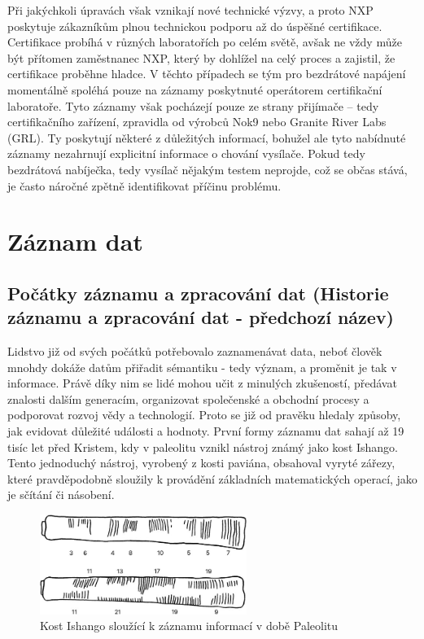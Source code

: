 Při jakýchkoli úpravách však vznikají nové technické výzvy, a proto NXP poskytuje zákazníkům plnou technickou podporu až do úspěšné certifikace. Certifikace 
probíhá v různých laboratořích po celém světě, avšak ne vždy může být přítomen zaměstnanec NXP, který by dohlížel na celý proces a zajistil, že certifikace 
proběhne hladce. V těchto případech se tým pro bezdrátové napájení momentálně spoléhá pouze na záznamy poskytnuté operátorem certifikační laboratoře. Tyto 
záznamy však pocházejí pouze ze strany přijímače – tedy certifikačního zařízení, zpravidla od výrobců Nok9 nebo Granite River Labs (GRL). Ty poskytují některé 
z důležitých informací, bohužel ale tyto nabídnuté záznamy nezahrnují explicitní informace o chování vysílače. Pokud tedy bezdrátová nabíječka, tedy vysílač 
nějakým testem neprojde, což se občas stává, je často náročné zpětně identifikovat příčinu problému. \cite{nxp_wireless_charging_team}


\chapter{Záznam dat}
\label{zaznam_dat}

\label{uvod}

\section{Počátky záznamu a zpracování dat (Historie záznamu a zpracování dat - předchozí název)}
\label{historie}
Lidstvo již od svých počátků potřebovalo zaznamenávat data, neboť člověk mnohdy dokáže datům přiřadit sémantiku - tedy význam, a proměnit je tak v informace. 
Právě díky nim se lidé mohou učit z minulých zkušeností, předávat znalosti dalším generacím, organizovat společenské a obchodní procesy a podporovat rozvoj 
vědy a technologií. Proto se již od pravěku hledaly způsoby, jak evidovat důležité události a hodnoty. První formy záznamu dat sahají až 19 tisíc let před 
Kristem, kdy v paleolitu vznikl nástroj známý jako kost Ishango. Tento jednoduchý nástroj, vyrobený z kosti paviána, obsahoval vyryté zářezy, které 
pravděpodobně sloužily k provádění základních matematických operací, jako je sčítání či násobení.

\begin{figure}[h] %
    \centering
    \includegraphics[width=0.6\textwidth]{obrazky-figures/ishango.jpg}
    \caption{Kost Ishango sloužící k záznamu informací v době Paleolitu \cite{ishango_picture}}
    \label{fig:ishango}
\end{figure}

